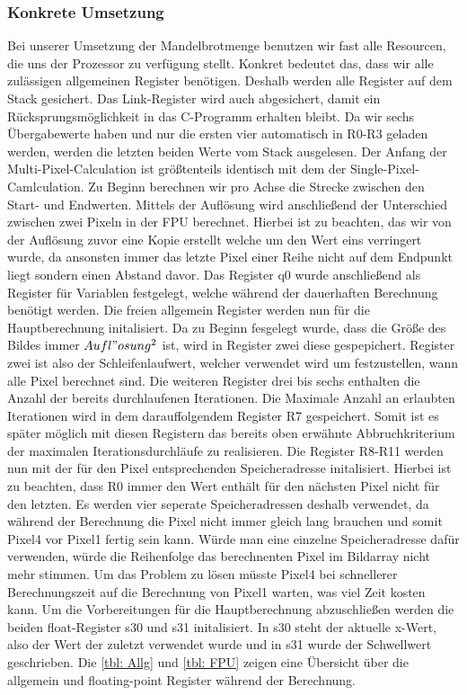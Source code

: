 \documentclass[11pt]{scrartcl}
\begin{document}
\pagebreak
\subsubsection{Konkrete Umsetzung}
Bei unserer Umsetzung der Mandelbrotmenge  benutzen wir fast alle Resourcen, die uns der Prozessor zu verfügung stellt.
Konkret bedeutet das, dass wir alle zulässigen allgemeinen Register benötigen. Deshalb werden alle Register auf dem Stack gesichert. Das Link-Register wird auch abgesichert, damit ein Rücksprungsmöglichkeit in das C-Programm erhalten bleibt.
Da wir sechs Übergabewerte haben und nur die ersten vier automatisch in R0-R3 geladen werden, werden die letzten beiden Werte vom Stack ausgelesen.
Der Anfang der Multi-Pixel-Calculation ist größtenteils identisch mit dem der Single-Pixel-Camlculation.
Zu Beginn berechnen wir pro Achse die Strecke zwischen den Start- und Endwerten.
Mittels der Auflösung wird anschließend der Unterschied zwischen zwei Pixeln in der FPU berechnet.
Hierbei ist zu beachten, das wir von der Auflösung zuvor eine Kopie erstellt welche um den Wert eins verringert wurde, da ansonsten immer das letzte Pixel einer Reihe nicht auf dem Endpunkt liegt sondern einen Abstand davor.
Das Register q0 wurde anschließend als Register für Variablen festgelegt, welche während der dauerhaften Berechnung benötigt werden.
Die freien allgemein Register werden nun für die Hauptberechnung initalisiert.
Da zu Beginn fesgelegt wurde, dass die Größe des Bildes immer $Aufl"osung^2$ ist, wird in Register zwei diese gespepichert.
Register zwei ist also der Schleifenlaufwert, welcher verwendet wird um festzustellen, wann alle Pixel berechnet sind.
Die weiteren Register drei bis sechs enthalten die Anzahl der bereits durchlaufenen Iterationen.
Die Maximale Anzahl an erlaubten Iterationen wird in dem darauffolgendem Register R7 gespeichert.
Somit ist es später möglich mit diesen Registern das bereits oben erwähnte Abbruchkriterium der maximalen Iterationsdurchläufe zu realisieren.
Die Register R8-R11 werden nun mit der für den Pixel entsprechenden Speicheradresse initalisiert.
Hierbei ist zu beachten, dass R0 immer den Wert enthält für den nächsten Pixel nicht für den letzten.
Es werden vier seperate Speicheradressen deshalb verwendet, da während der Berechnung die Pixel nicht immer gleich lang brauchen und somit Pixel4 vor Pixel1 fertig sein kann.
Würde man eine einzelne Speicheradresse dafür verwenden, würde die Reihenfolge das berechnenten Pixel im Bildarray nicht mehr stimmen.
Um das Problem zu lösen müsste Pixel4 bei schnellerer Berechnungszeit auf die Berechnung von Pixel1 warten, was viel Zeit kosten kann.
Um die Vorbereitungen für die Hauptberechnung abzuschließen werden die beiden float-Register s30 und s31 initalisiert.
In s30 steht der aktuelle x-Wert, also der Wert der zuletzt verwendet wurde und in s31 wurde der Schwellwert geschrieben.
Die \autoref{tbl: Allg} und \autoref{tbl: FPU} zeigen eine Übersicht über die allgemein und floating-point Register während der Berechnung.
\end{document}
